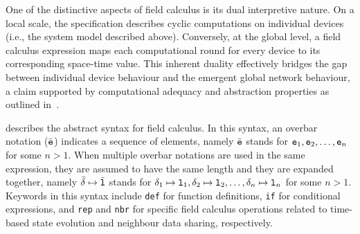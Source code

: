One of the distinctive aspects of field calculus is its dual interpretive nature. 
 On a local scale, the specification describes cyclic computations on individual devices 
 (i.e., the system model described above). 
% 
Conversely, at the global level, 
 a field calculus expression maps each computational round for every device to its corresponding space-time value. 
 This inherent duality effectively bridges the gap between individual device behaviour and the emergent global network behaviour,
 a claim supported by computational adequacy and abstraction properties as outlined in~\cite{audrito2019tocl}.

 describes the abstract syntax for field calculus. 
 In this syntax, an overbar notation ($\bar{\texttt{e}}$) indicates a sequence of elements, 
 namely $\bar{\texttt{e}}$ stands for $\texttt{e}_1, \texttt{e}_2, \ldots, \texttt{e}_n$ for some $n > 1$.
 When multiple overbar notations are used in the same expression,
 they are assumed to have the same length and they are expanded together,
 namely $\bar{\delta} \mapsto \bar{\texttt{l}}$ stands for $\delta_1 \mapsto \texttt{l}_1, \delta_2 \mapsto \texttt{l}_2, \ldots, \delta_n \mapsto \texttt{l}_n$ for some $n > 1$.
 Keywords in this syntax include \texttt{def} for function definitions, 
 \texttt{if} for conditional expressions, 
 and \texttt{rep} and \texttt{nbr} for specific field calculus operations related to time-based state evolution and neighbour data sharing, respectively.


